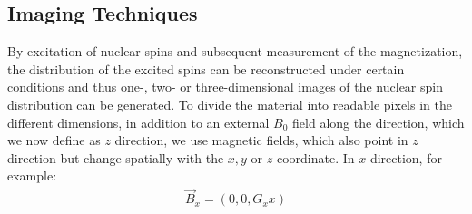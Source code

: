 \subsection{Imaging Techniques}
By excitation of nuclear spins and subsequent measurement of the magnetization, the distribution of the excited spins can be reconstructed under certain conditions and thus one-, two- or three-dimensional images of the nuclear spin distribution can be generated.
To divide the material into readable pixels in the different dimensions, in addition to an external $B_0$ field along the direction, which we now define as $z$ direction, we use magnetic fields, which also point in $z$ direction but change spatially with the $x, y$ or $z$ coordinate.
In $x$ direction, for example:
\begin{align*}
\vec{B}_x=(0,0,G_xx)
\end{align*}

